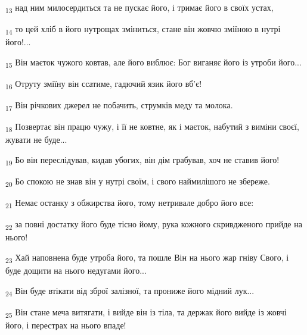 \begin{tcolorbox}
\textsubscript{13} над ним милосердиться та не пускає його, і тримає його в своїх устах,
\end{tcolorbox}
\begin{tcolorbox}
\textsubscript{14} то цей хліб в його нутрощах зміниться, стане він жовчю зміїною в нутрі його!...
\end{tcolorbox}
\begin{tcolorbox}
\textsubscript{15} Він маєток чужого ковтав, але його виблює: Бог виганяє його із утроби його...
\end{tcolorbox}
\begin{tcolorbox}
\textsubscript{16} Отруту зміїну він ссатиме, гадючий язик його вб'є!
\end{tcolorbox}
\begin{tcolorbox}
\textsubscript{17} Він річкових джерел не побачить, струмків меду та молока.
\end{tcolorbox}
\begin{tcolorbox}
\textsubscript{18} Позвертає він працю чужу, і її не ковтне, як і маєток, набутий з виміни своєї, жувати не буде...
\end{tcolorbox}
\begin{tcolorbox}
\textsubscript{19} Бо він переслідував, кидав убогих, він дім грабував, хоч не ставив його!
\end{tcolorbox}
\begin{tcolorbox}
\textsubscript{20} Бо спокою не знав він у нутрі своїм, і свого наймилішого не збереже.
\end{tcolorbox}
\begin{tcolorbox}
\textsubscript{21} Немає останку з обжирства його, тому нетривале добро його все:
\end{tcolorbox}
\begin{tcolorbox}
\textsubscript{22} за повні достатку його буде тісно йому, рука кожного скривдженого прийде на нього!
\end{tcolorbox}
\begin{tcolorbox}
\textsubscript{23} Хай наповнена буде утроба його, та пошле Він на нього жар гніву Свого, і буде дощити на нього недугами його...
\end{tcolorbox}
\begin{tcolorbox}
\textsubscript{24} Він буде втікати від зброї залізної, та прониже його мідний лук...
\end{tcolorbox}
\begin{tcolorbox}
\textsubscript{25} Він стане меча витягати, і вийде він із тіла, та держак його вийде із жовчі його, і перестрах на нього впаде!
\end{tcolorbox}
